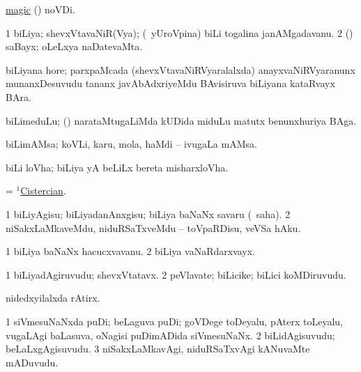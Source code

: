\bentry
{}
\gl{\nA}
\bmng
\hyperref{kandict_m.pdf}{M}{magic(1) pagu(3)}{magic} (\pagu {}) noVDi. 
\emng
\eentry

\bentry
{} 
\gl{\nA}
\expl{}
\bmng
\bnum
\num{1} biLiya; shevxVtavaNiR(Vya); (\kanmu\ yUroVpina) biLi togalina janAMgadavanu. 
\num{2} (\AmA) saBayx; oLeLxya naDatevaMta. 
\enum
\emng

\noindent
\gl{\pagu}
\expl{}
\bmng
{} biLiyana hore; parxpaMcada (shevxVtavaNiRVyaralalxda) anayxvaNiRVyaranunx munanxDesuvudu tananx javAbAdxriyeMdu BAvisiruva biLiyana kataRvayx BAra. 
\emng
\eentry

\bentry
{}
\gl{\nA}
\bmng
biLimeduLu; (\kanmu) narataMtugaLiMda kUDida miduLu matutx benunxhuriya BAga. 
\emng
\eentry

\bentry
{}
\gl{\nA}
\bmng
biLimAMsa; koVLi, karu, mola, haMdi -- ivugaLa mAMsa. 
\emng
\eentry

\bentry
{}
\gl{\nA}
\bmng
biLi loVha; biLiya yA beLiLx bereta misharxloVha. 
\emng
\eentry

\bentry
{}
\gl{\nA}
\bmng
= \hyperref{kandict_c.pdf}{C}{Cistercian(1)}{$^1$Cistercian}. 
\emng
\eentry

\bentry
{}
\gl{\sakirx}
\bmng
\bnum
\num{1} biLiyAgisu; biLiyadanAnxgisu; biLiya baNaNx savaru (\akirx\ saha). 
\num{2} niSakxLaMkaveMdu, niduRSaTxveMdu -- toVpaRDisu, veVSa hAku. 
\enum
\emng
\eentry

\bentry
{}
\gl{\nA}
\bmng
\bnum
\num{1} biLiya baNaNx hacucxvavanu. 
\num{2} biLiya vaNaRdarxvayx. 
\enum
\emng
\eentry

\bentry
{}
\gl{\nA}
\bmng
\bnum
\num{1} biLiyadAgiruvudu; shevxVtatavx. 
\num{2} peVlavate; biLicike; biLici koMDiruvudu. 
\enum
\emng
\eentry

\bentry
{}
\gl{\nA}
\bmng
nidedxyilalxda rAtirx. 
\emng
\eentry

\bentry
{}
\gl{\nA}
\bmng
\bnum
\num{1} siVmesuNaNxda puDi; beLaguva puDi; goVDege toDeyalu, pAterx toLeyalu, \mo vugaLAgi baLasuva, oNagisi puDimADida siVmesuNaNx. 
\num{2} biLidAgisuvudu; beLaLxgAgisuvudu. 
\num{3} niSakxLaMkavAgi, niduRSaTxvAgi kANuvaMte mADuvudu. 
\enum
\emng
\eentry

